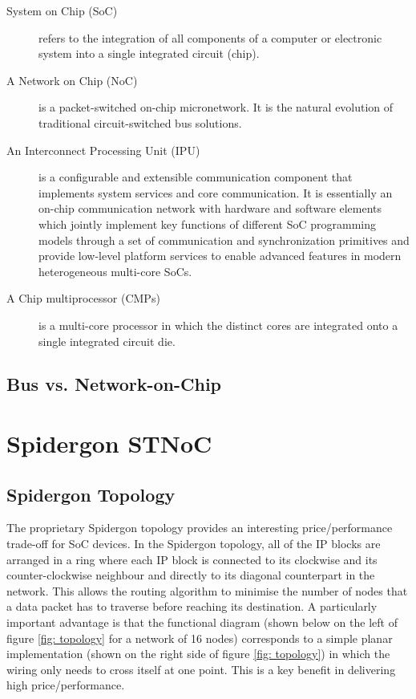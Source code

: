 \begin{description}

\item[System on Chip (SoC)] 
	
refers to the integration of all components of a computer or electronic system into a single integrated circuit (chip).\cite{wikiSoC}
	
\item[A Network on Chip (NoC)] 

is a packet-switched on-chip micronetwork. 
It is the natural evolution of traditional circuit-switched bus solutions. 
	
\item[An Interconnect Processing Unit (IPU)] 
	
is a configurable and extensible communication component that implements system services and core communication. 
It is essentially an on-chip communication network with hardware and software elements which jointly implement key functions of different SoC programming models through a set of communication and synchronization primitives and provide low-level platform services to enable advanced features in modern heterogeneous multi-core SoCs.\cite{coppola2008design}

\item[A Chip multiprocessor (CMPs)] 

is a multi-core processor in which the distinct cores are integrated onto a single integrated circuit die.

\end{description}

\subsection{Bus vs. Network-on-Chip}\label{S:busvsnoc}

\section{Spidergon STNoC}\label{S:stnoc}

\subsection{Spidergon Topology}\label{S:topology}

The proprietary Spidergon topology provides an interesting price/performance trade-off for SoC devices. 
In the Spidergon topology, all of the IP blocks are arranged in a ring where each IP block is connected to its clockwise and its counter-clockwise neighbour and directly to its diagonal counterpart in the network. 
This allows the routing algorithm to minimise the number of nodes that a data packet has to traverse before reaching its destination. 
A particularly important advantage is that the functional diagram (shown below on the left of figure \ref{fig: topology} for a network of 16 nodes) corresponds to a simple planar implementation (shown on the right side of figure \ref{fig: topology}) in which the wiring only needs to cross itself at one point. This is a key benefit in delivering high price/performance. \cite{STMicroelectronics2005}

